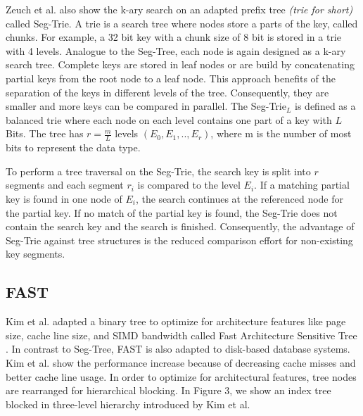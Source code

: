 \documentclass[runningheads,a4paper]{llncs}
\begin{document}
Zeuch et al. also show the k-ary search on an adapted prefix tree \emph{(trie for short)} called Seg-Trie. A trie is a search tree where nodes store a parts of the key, called chunks. For example, a 32 bit key with a chunk size of 8 bit is stored in a trie with 4 levels. Analogue to the Seg-Tree, each node is again designed as a k-ary search tree. Complete keys are stored in leaf nodes or are build by concatenating partial keys from the root node to a leaf node. This approach benefits of the separation of the keys in different levels of the tree. Consequently, they are smaller and more keys can be compared in parallel. The Seg-Trie$_L$ is defined as a balanced trie where each node on each level contains one part of a key with $L$ Bits. The tree has $r = \frac{m}{L}$ levels $(E_0, E_1, .., E_r)$, where m is the number of most bits to represent the data type.

To perform a tree traversal on the Seg-Trie, the search key is split into $r$ segments and each segment $r_i$ is compared to the level $E_i$. If a matching partial key is found in one node of $E_i$, the search continues at the referenced node for the partial key. If no match of the partial key is found, the Seg-Trie does not contain the search key and the search is finished. Consequently, the advantage of Seg-Trie against tree structures is the reduced comparison effort for non-existing key segments. 


\subsection{FAST}\label{SCM}
Kim et al. adapted a binary tree to optimize for architecture features like page size, cache line size, and SIMD bandwidth called Fast Architecture Sensitive Tree \cite{kim2010fast}. In contrast to Seg-Tree, FAST is also adapted to disk-based database systems. Kim et al. show the performance increase because of decreasing cache misses and better cache line usage. In order to optimize for architectural features, tree nodes are rearranged for hierarchical blocking. In Figure 3, we show an index tree blocked in three-level hierarchy introduced by Kim et al. 
\end{document}
